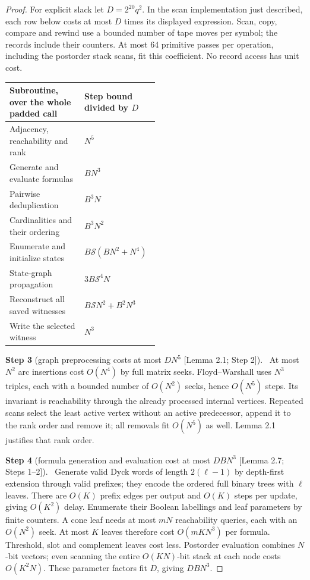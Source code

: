 \documentclass[11pt,a4paper]{article}
\theoremstyle{plain}
\theoremstyle{definition}
\newcommand{\step}[2]{\par\smallskip\noindent\textbf{Step #1} (#2).\ \ignorespaces}
\begin{document}
\begin{proof}
For explicit slack let $D=2^{20}q^2$. In the scan implementation just
described, each row below costs at most $D$ times its displayed
expression. Scan, copy, compare and rewind use a bounded number of tape
moves per symbol; the records include their counters. At most 64
primitive passes per operation, including the postorder stack scans,
fit this coefficient. No record access has unit cost.

\begin{center}\small
\begin{tabularx}{\linewidth}{@{}p{0.50\linewidth}X@{}}
\toprule
Subroutine, over the whole padded call & Step bound divided by $D$\\
\midrule
Adjacency, reachability and rank & $N^5$\\
Generate and evaluate formulas & $BN^3$\\
Pairwise deduplication & $B^3N$\\
Cardinalities and their ordering & $B^3N^2$\\
Enumerate and initialize states & $B\mathcal{S}(BN^2+N^4)$\\
State-graph propagation & $3B\mathcal{S}^4N$\\
Reconstruct all saved witnesses & $B\mathcal{S}N^2+B^2N^3$\\
Write the selected witness & $N^3$\\
\bottomrule
\end{tabularx}
\end{center}

\step{3}{graph preprocessing costs at most $DN^5$ [Lemma 2.1; Step 2]}
At most $N^2$ arc insertions cost $O(N^4)$ by full matrix seeks.
Floyd--Warshall uses $N^3$ triples, each with a bounded number of
$O(N^2)$ seeks, hence $O(N^5)$ steps. Its invariant is reachability
through the already processed internal vertices. Repeated scans select
the least active vertex without an active predecessor, append it to the
rank order and remove it; all removals fit $O(N^5)$ as well. Lemma 2.1
justifies that rank order.

\step{4}{formula generation and evaluation cost at most $DBN^3$ [Lemma 2.7; Steps 1--2]}
Generate valid Dyck words of length $2(\ell-1)$ by depth-first
extension through valid prefixes; they encode the ordered full binary
trees with $\ell$ leaves. There are $O(K)$ prefix edges per output and
$O(K)$ steps per update, giving $O(K^2)$ delay. Enumerate their Boolean
labellings and leaf parameters by finite counters. A cone leaf needs at most $mN$
reachability queries, each with an $O(N^2)$ seek. At most $K$ leaves
therefore cost $O(mKN^3)$ per formula. Threshold, slot and complement
leaves cost less. Postorder evaluation combines $N$-bit vectors; even
scanning the entire $O(KN)$-bit stack at each node costs $O(K^2N)$.
These parameter factors fit $D$, giving $DBN^3$.


\end{proof}
\end{document}
